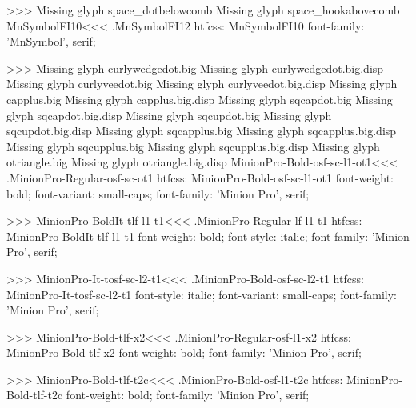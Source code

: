{>>>
Missing glyph	space_dotbelowcomb
Missing glyph	space_hookabovecomb
\<MnSymbolFI10\><<<
.MnSymbolFI12
htfcss:  MnSymbolFI10  font-family: 'MnSymbol', serif;

>>>
Missing glyph	curlywedgedot.big
Missing glyph	curlywedgedot.big.disp
Missing glyph	curlyveedot.big
Missing glyph	curlyveedot.big.disp
Missing glyph	capplus.big
Missing glyph	capplus.big.disp
Missing glyph	sqcapdot.big
Missing glyph	sqcapdot.big.disp
Missing glyph	sqcupdot.big
Missing glyph	sqcupdot.big.disp
Missing glyph	sqcapplus.big
Missing glyph	sqcapplus.big.disp
Missing glyph	sqcupplus.big
Missing glyph	sqcupplus.big.disp
Missing glyph	otriangle.big
Missing glyph	otriangle.big.disp
\<MinionPro-Bold-osf-sc-l1-ot1\><<<
.MinionPro-Regular-osf-sc-ot1
htfcss:  MinionPro-Bold-osf-sc-l1-ot1  font-weight: bold; font-variant: small-caps; font-family: 'Minion Pro', serif;

>>>
\<MinionPro-BoldIt-tlf-l1-t1\><<<
.MinionPro-Regular-lf-l1-t1
htfcss:  MinionPro-BoldIt-tlf-l1-t1  font-weight: bold; font-style: italic; font-family: 'Minion Pro', serif;

>>>
\<MinionPro-It-tosf-sc-l2-t1\><<<
.MinionPro-Bold-osf-sc-l2-t1
htfcss:  MinionPro-It-tosf-sc-l2-t1  font-style: italic; font-variant: small-caps; font-family: 'Minion Pro', serif;

>>>
\<MinionPro-Bold-tlf-x2\><<<
.MinionPro-Regular-osf-l1-x2
htfcss:  MinionPro-Bold-tlf-x2  font-weight: bold; font-family: 'Minion Pro', serif;

>>>
\<MinionPro-Bold-tlf-t2c\><<<
.MinionPro-Bold-osf-l1-t2c
htfcss:  MinionPro-Bold-tlf-t2c  font-weight: bold; font-family: 'Minion Pro', serif;

}
